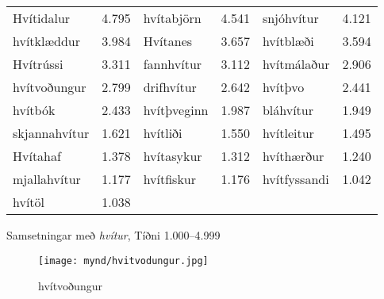 \documentclass{../litmal.tex}{subfiles}
\begin{document}
\begin{wordlist}[H]
\begin{tcolorbox}

	\setlength{\extrarowheight}{3pt}
	\begin{tabular}{BlBlBl}
		Hvítidalur	& 4.795 		&  
		hvítabjörn	& 4.541		&  
		snjóhvítur	& 4.121		\\ 
		hvítklæddur	& 3.984		&  
		Hvítanes		& 3.657		&  
		hvítblæði	& 3.594		\\ 
		Hvítrússi		& 3.311		& 
		fannhvítur	& 3.112		& 
		hvítmálaður	& 2.906		\\  
		hvítvoðungur	 & 2.799		&  
		drifhvítur	& 2.642		& 
		hvítþvo		& 2.441		\\  
		hvítbók		& 2.433		&  
		hvítþveginn	& 1.987		&  
		bláhvítur		& 1.949		\\ 
		skjannahvítur & 1.621		&  
		hvítliði		& 1.550		& 
		hvítleitur		& 1.495		\\  
		Hvítahaf		& 1.378		&  
		hvítasykur	& 1.312		& 
		hvíthærður	& 1.240		\\ 
		mjallahvítur	& 1.177		& 
		hvítfiskur	& 1.176		& 
		hvítfyssandi	& 1.042		\\  
		hvítöl		& 1.038		&  
					& 			& 
					&
	\end{tabular}
\end{tcolorbox}
	\caption{Samsetningar með \textit{hvítur}, Tíðni 1.000--4.999}
	\label{listi:hvitt.1000}
\end{wordlist}

\begin{figure}[H]
\begin{tcolorbox}
\centering
	\texttt{[image: mynd/hvitvodungur.jpg]}
\end{tcolorbox}
	\caption{hvítvoðungur}
	\label{mynd:hvitvodungur}
\end{figure}
\end{document}
